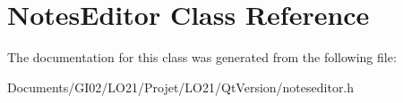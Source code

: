 \hypertarget{class_notes_editor}{}\section{Notes\+Editor Class Reference}
\label{class_notes_editor}


The documentation for this class was generated from the following file\+:\begin{DoxyCompactItemize}
\item 
Documents/\+G\+I02/\+L\+O21/\+Projet/\+L\+O21/\+Qt\+Version/noteseditor.\+h\end{DoxyCompactItemize}
